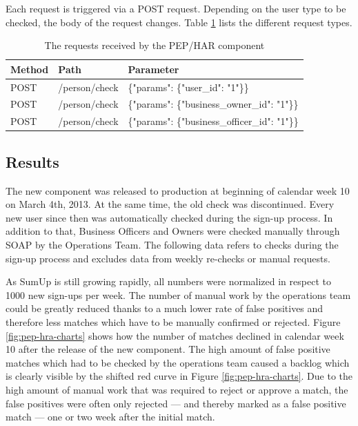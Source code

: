 \documentclass[a4paper, oneside]{csthesis}
\begin{document}
Each request is triggered via a POST request. Depending on the user type to be checked, the body of the request changes. Table \ref{tbl:har-pep-requests} lists the different request types.

\begin{table}[tb]
    \begin{center}
        \begin{tabular}{p{1.75cm}|p{3cm}p{7cm}}
        \hline
        \textbf{Method} & \textbf{Path} & \textbf{Parameter} \\
        \hline
        POST & /person/check & \{"params": \{"user\_id": "1"\}\} \\ \hdashline[0.5pt/3pt]
        POST & /person/check & \{"params": \{"business\_owner\_id": "1"\}\} \\ \hdashline[0.5pt/3pt]
        POST & /person/check & \{"params": \{"business\_officer\_id": "1"\}\} \\
        \hline
        \end{tabular}
    \end{center}
    \caption{The requests received by the PEP/HAR component}
    \label{tbl:har-pep-requests}
\end{table}

\subsection{Results}

The new component was released to production at beginning of calendar week 10 on March 4th, 2013. At the same time, the old check was discontinued. Every new user since then was automatically checked during the sign-up process. In addition to that, Business Officers and Owners were checked manually through SOAP by the Operations Team. The following data refers to checks during the sign-up process and excludes data from weekly re-checks or manual requests.

As SumUp is still growing rapidly, all numbers were normalized in respect to 1000 new sign-ups per week. The number of manual work by the operations team could be greatly reduced thanks to a much lower rate of false positives and therefore less matches which have to be manually confirmed or rejected. Figure \ref{fig:pep-hra-charts} shows how the number of matches declined in calendar week 10 after the release of the new component.
The high amount of false positive matches which had to be checked by the operations team caused a backlog which is clearly visible by the shifted red curve in Figure \ref{fig:pep-hra-charts}. Due to the high amount of manual work that was required to reject or approve a match, the false positives were often only rejected --- and thereby marked as a false positive match  --- one or two week after the initial match.
\end{document}

